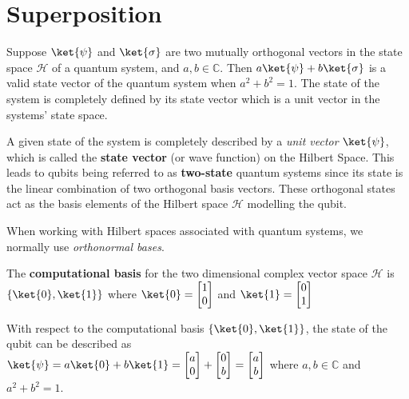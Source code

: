 \section{Superposition}

\begin{lemma}
    Suppose $\ket{\psi}$ and $\ket{\sigma}$ are two mutually orthogonal vectors in the state space $\mathcal{H}$ of a quantum system, and $a, b \in \mathbb{C}$. Then $a \ket{\psi} + b \ket{\sigma}$ is a valid state vector of the quantum system when $a^2 + b^2 = 1$. The state of the system is completely defined by its state vector which is a unit vector in the systems' state space.
\end{lemma}

A given state of the system is completely described by a \textit{unit vector} $\ket{\psi}$, which is called the \textbf{state vector} (or wave function) on the Hilbert Space. This leads to qubits being referred to as \textbf{two-state} quantum systems since its state is the linear combination of two orthogonal basis vectors. These orthogonal states act as the basis elements of the Hilbert space $\mathcal{H}$ modelling the qubit.

\vspace*{0.75cm}
When working with Hilbert spaces associated with quantum systems, we normally use \textit{orthonormal bases}.
\begin{defn}
The \textbf{computational basis} for the two dimensional complex vector space $\mathcal{H}$ is $\{ \ket{0}, \ket{1} \}$ where $\ket{0} = \begin{bmatrix} 1 \\ 0 \end{bmatrix}$ and $\ket{1} = \begin{bmatrix} 0 \\ 1 \end{bmatrix}$
\end{defn}

With respect to the computational basis $\{ \ket{0}, \ket{1} \}$, the state of the qubit can be described as \\ $\ket{\psi} = a \ket{0} + b \ket{1} = \begin{bmatrix} a \\ 0 \end{bmatrix} + \begin{bmatrix} 0 \\ b \end{bmatrix} = \begin{bmatrix} a \\ b \end{bmatrix} $ where $a, b \in \mathbb{C}$ and $a^2 + b^2 = 1$.

